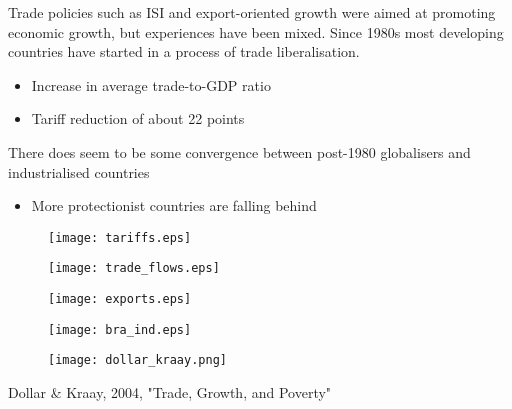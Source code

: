 \documentclass{beamer}
\begin{document}
\begin{frame}
 Trade policies such as ISI and export-oriented growth were aimed at promoting economic growth, but experiences have been mixed.
 Since 1980s most developing countries have started in a process of trade liberalisation.
 \begin{itemize}
   \item Increase in average trade-to-GDP ratio 
   \item Tariff reduction of about 22 points
 \end{itemize}
 \medskip
 There does seem to be some convergence between post-1980 globalisers and industrialised countries
 \begin{itemize}
   \item More protectionist countries are falling behind
 \end{itemize} 
\end{frame}

\begin{frame}
  \begin{figure}
    \texttt{[image: tariffs.eps]}
  \end{figure}
\end{frame}

\begin{frame}
  \begin{figure}
    \texttt{[image: trade\_flows.eps]}
  \end{figure}
\end{frame}

\begin{frame}
  \begin{figure}
    \texttt{[image: exports.eps]}
  \end{figure}
\end{frame}

\begin{frame}
  \begin{figure}
    \texttt{[image: bra\_ind.eps]}
  \end{figure}
\end{frame}

\begin{frame}
  \begin{figure}
    \texttt{[image: dollar\_kraay.png]}
  \end{figure}
  Dollar \& Kraay, 2004, "Trade, Growth, and Poverty"
\end{frame}
\end{document}

